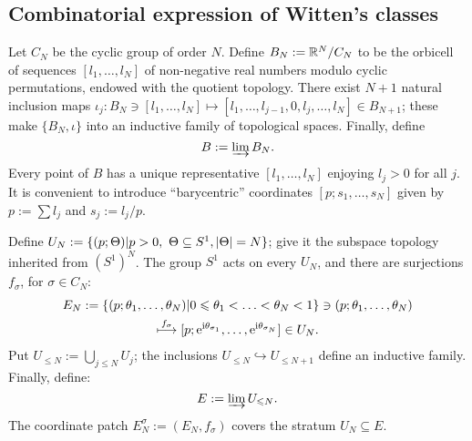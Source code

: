 \subsection{Combinatorial expression of Witten's classes}
\label{sec:wittens-classes-comb}
Let $C_N$ be the cyclic group of order $N$. Define $B_N := \setR^N / C_N$
to be the orbicell of sequences $[l_1, \ldots, l_N]$ of non-negative real
numbers modulo cyclic permutations, endowed with the quotient
topology. There exist $N+1$ natural inclusion maps $\iota_j: B_N \ni [l_1,
\ldots, l_N] \mapsto [l_1, \ldots, l_{j-1}, 0, l_j, \ldots, l_N] \in B_{N+1}$; these
make $\{B_N, \iota\}$ into an inductive family of topological spaces.
Finally, define
\begin{equation*}
  B := \varinjlim B_N.
\end{equation*}
Every point of $B$ has a unique representative $[l_1, \ldots, l_N]$
enjoying $l_j > 0$ for all $j$. It is convenient to introduce
``barycentric'' coordinates $[p; s_1, \ldots, s_N]$ given by $p := \sum l_j$
and $s_j := l_j/p$.

Define $U_N := \{ (p; \Theta) | p>0, \ \Theta\subseteq S^1, \card{\Theta} = N\}$; give it the
subspace topology inherited from $(S^1)^N$. The group $S^1$ acts on
every $U_N$, and there are surjections $f_\sigma$, for $\sigma \in C_N$:
\begin{multline*}
  E_N := \{ (p; \theta_1, \ldots, \theta_N) | 0\leq \theta_1 < \ldots < \theta_N < 1\} \ni (p;
  \theta_1, \ldots, \theta_N) 
  \\
  \stackrel{f_\sigma}{\longmapsto} [p; \E^{\I\theta_{\sigma_1}}, \ldots,
  \E^{\I\theta_{\sigma_N}}] \in U_N.
\end{multline*}
Put $U_{\leq N} := \bigcup_{j \leq N} U_j$; the inclusions $U_{\leq N} \hookrightarrow U_{\leq
  N+1}$ define an inductive family. Finally, define:
\begin{equation*}
  E := \varinjlim U_{\leq N}.
\end{equation*}
The coordinate patch $E^\sigma_N := (E_N, f_\sigma)$ covers the stratum $U_N
\subseteq E$.

